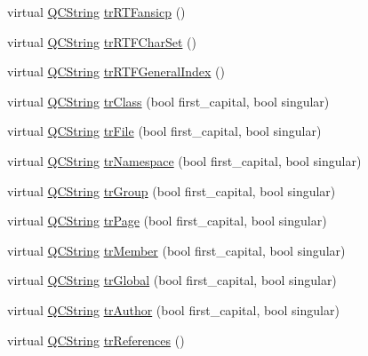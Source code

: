 \begin{DoxyCompactItemize}
\item 
virtual \mbox{\hyperlink{class_q_c_string}{Q\+C\+String}} \mbox{\hyperlink{class_translator_dutch_ae0b6e77d800b7a57e9b17f689fb81771}{tr\+R\+T\+Fansicp}} ()
\item 
virtual \mbox{\hyperlink{class_q_c_string}{Q\+C\+String}} \mbox{\hyperlink{class_translator_dutch_aefa5abdf5065d86bc2a02c95c301118a}{tr\+R\+T\+F\+Char\+Set}} ()
\item 
virtual \mbox{\hyperlink{class_q_c_string}{Q\+C\+String}} \mbox{\hyperlink{class_translator_dutch_ad8f9b957281e4b46e08c110c200ebaf2}{tr\+R\+T\+F\+General\+Index}} ()
\item 
virtual \mbox{\hyperlink{class_q_c_string}{Q\+C\+String}} \mbox{\hyperlink{class_translator_dutch_ae5c72fc8e607d48f0f1084108a662f34}{tr\+Class}} (bool first\+\_\+capital, bool singular)
\item 
virtual \mbox{\hyperlink{class_q_c_string}{Q\+C\+String}} \mbox{\hyperlink{class_translator_dutch_a13ca5c92ff75a2c44962e926d3d55aea}{tr\+File}} (bool first\+\_\+capital, bool singular)
\item 
virtual \mbox{\hyperlink{class_q_c_string}{Q\+C\+String}} \mbox{\hyperlink{class_translator_dutch_ace82533e75f03a0747bb831f4ee0d959}{tr\+Namespace}} (bool first\+\_\+capital, bool singular)
\item 
virtual \mbox{\hyperlink{class_q_c_string}{Q\+C\+String}} \mbox{\hyperlink{class_translator_dutch_a2ca257473515f26db8261213517f76ae}{tr\+Group}} (bool first\+\_\+capital, bool singular)
\item 
virtual \mbox{\hyperlink{class_q_c_string}{Q\+C\+String}} \mbox{\hyperlink{class_translator_dutch_a5cbf8865535ebece78ff6a41c904e327}{tr\+Page}} (bool first\+\_\+capital, bool singular)
\item 
virtual \mbox{\hyperlink{class_q_c_string}{Q\+C\+String}} \mbox{\hyperlink{class_translator_dutch_a2a80b7a963cbeea8ffdc12831224f164}{tr\+Member}} (bool first\+\_\+capital, bool singular)
\item 
virtual \mbox{\hyperlink{class_q_c_string}{Q\+C\+String}} \mbox{\hyperlink{class_translator_dutch_a84677edea3afc4551b0ac3a00b6283e6}{tr\+Global}} (bool first\+\_\+capital, bool singular)
\item 
virtual \mbox{\hyperlink{class_q_c_string}{Q\+C\+String}} \mbox{\hyperlink{class_translator_dutch_a12714f2eb503c562abbfa75864801fc2}{tr\+Author}} (bool first\+\_\+capital, bool singular)
\item 
virtual \mbox{\hyperlink{class_q_c_string}{Q\+C\+String}} \mbox{\hyperlink{class_translator_dutch_a5f3c8f9bee79ac5046cb7841378c3d84}{tr\+References}} ()

\end{DoxyCompactItemize}
